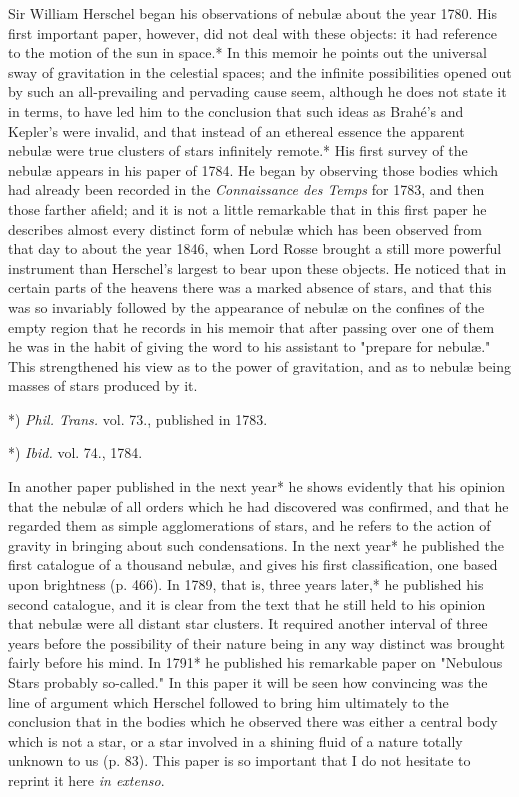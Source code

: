 \documentclass[a4paper, 12pt, oneside, polutonikogreek, english]{article}
\begin{document}
Sir William Herschel began his observations of nebulæ about the year 1780. His first important paper, however, did not deal with these objects: it had reference to the motion of the sun in space.* In this memoir he points out the universal sway of gravitation in the celestial spaces; and the infinite possibilities opened out by such an all-prevailing and pervading cause seem, although he does not state it in terms, to have led him to the conclusion that such ideas as Brahé's and Kepler's were invalid, and that instead of an ethereal essence the apparent nebulæ were true clusters of stars infinitely remote.* His first survey of the nebulæ appears in his paper of 1784. He began by observing those bodies which had already been recorded in the \emph{Connaissance des Temps} for 1783, and then those farther afield; and it is not a little remarkable that in this first paper he describes almost every distinct form of nebulæ which has been observed from that day to about the year 1846, when Lord Rosse brought a still more powerful instrument than Herschel's largest to bear upon these objects. He noticed that in certain parts of the heavens there was a marked absence of stars, and that this was so invariably followed by the appearance of nebulæ on the confines of the empty region that he records in his memoir that after passing over one of them he was in the habit of giving the word to his assistant to "prepare for nebulæ." This strengthened his view as to the power of gravitation, and as to nebulæ being masses of stars produced by it.

*) \emph{Phil. Trans.} vol. 73., published in 1783.

*) \emph{Ibid.} vol. 74., 1784.

In another paper published in the next year* he shows evidently that his opinion that the nebulæ of all orders which he had discovered was confirmed, and that he regarded them as simple agglomerations of stars, and he refers to the action of gravity in bringing about such condensations. In the next year* he published the first catalogue of a thousand nebulæ, and gives his first classification, one based upon brightness (p. 466). In 1789, that is, three years later,* he published his second catalogue, and it is clear from the text that he still held to his opinion that nebulæ were all distant star clusters. It required another interval of three years before the possibility of their nature being in any way distinct was brought fairly before his mind. In 1791* he published his remarkable paper on "Nebulous Stars probably so-called." In this paper it will be seen how convincing was the line of argument which Herschel followed to bring him ultimately to the conclusion that in the bodies which he observed there was either a central body which is not a star, or a star involved in a shining fluid of a nature totally unknown to us (p. 83). This paper is so important that I do not hesitate to reprint it here \emph{in extenso}.
\end{document}
